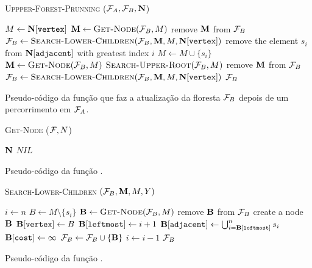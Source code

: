 \begin{algorithm}[H]
    \textsc{Uppper-Forest-Prunning} ($\mathcal{F}_A, \mathcal{F}_B, \mathbf N$)
    \begin{algorithmic}[1]
        \State $M \gets \mathbf N[\texttt{vertex}]$
            \State $\mathbf M \gets {\normalfont\textsc{Get-Node}} (\mathcal{F}_B, M)$
                \State remove $\mathbf M$ from $\mathcal{F}_B$
            \EndIf
            \State $\mathcal{F}_B \gets {\normalfont\textsc{Search-Lower-Children}} (\mathcal{F}_B, \mathbf M, M, \mathbf N[\texttt{vertex}])$
            \State remove the element $s_i$ from $\mathbf N[\texttt{adjacent}]$ with greatest index $i$
            \State $M \gets M \cup \{s_i\}$
        \EndWhile
        \State $\mathbf M \gets {\normalfont\textsc{Get-Node}} (\mathcal{F}_B, M)$
            \State ${\normalfont\textsc{Search-Upper-Root}} (\mathcal{F}_B, M)$
        \Else
            \State remove $\mathbf M$ from $\mathcal{F}_B$
        \EndIf
        \State $\mathcal{F}_B \gets {\normalfont\textsc{Search-Lower-Children}} (\mathcal{F}_B, \mathbf M, M, \mathbf N[\texttt{vertex}])$
        \Return $\mathcal{F}_B$
    \end{algorithmic}
    \caption{Pseudo-código da função que faz a atualização da floresta $\mathcal{F}_B$ depois de um 
    percorrimento em $\mathcal{F}_A$.}
    \label{pfs:code:pfs:C}
\end{algorithm}

\begin{algorithm}[H]
    \textsc{Get-Node} ($\mathcal{F}, N$)
    \begin{algorithmic}[1]
            \Return $\mathbf N$
        \Else
            \Return $NIL$
        \EndIf
    \end{algorithmic}
\caption{Pseudo-código da função .}
\label{alg:Get-Node}
\end{algorithm}

\begin{algorithm}[H]
\textsc{Search-Lower-Children} $(\mathcal{F}_B, \mathbf M, M, Y)$
\begin{algorithmic}[1]
    \State $i \gets n$
        \State $B \gets M \setminus \{s_i\}$
            \State $\mathbf B \gets {\normalfont\textsc{Get-Node}} (\mathcal{F}_B, M)$
                \State remove $\mathbf B$ from $\mathcal{F}_B$
            \EndIf
        \Else
            \State create a node $\mathbf B$
            \State $\mathbf B[\texttt{vertex}] \gets B$
            \State $\mathbf B[\texttt{leftmost}] \gets i + 1$
            \State $\mathbf B[\texttt{adjacent}] \gets \bigcup_{i=\mathbf B[\texttt{leftmost}]}^{n} s_i$
            \State $\mathbf B[\texttt{cost}] \gets \infty$
            \State $\mathcal{F}_B \gets \mathcal{F}_B \cup \{\mathbf B\}$ 
        \EndIf
        \State $i \gets i - 1$
        \Return $\mathcal{F}_B$
    \EndWhile
\end{algorithmic}
\caption{Pseudo-código da função .}
\label{pfs:code:pfs:D}
\end{algorithm}

